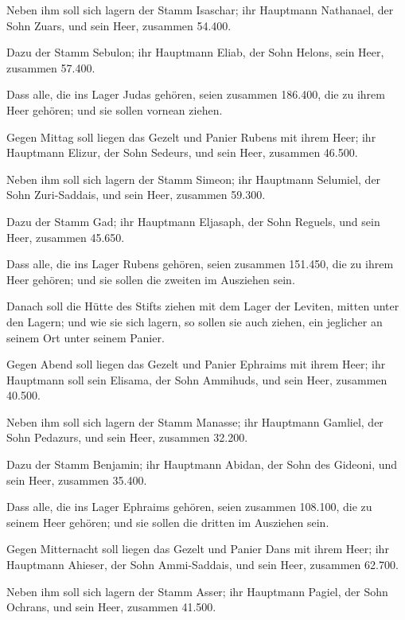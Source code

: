  Neben ihm soll sich lagern der Stamm Isaschar; ihr
Hauptmann Nathanael, der Sohn Zuars,  und sein Heer,
zusammen 54.400.

 Dazu der Stamm Sebulon; ihr Hauptmann Eliab, der Sohn
Helons,  sein Heer, zusammen 57.400.

 Dass alle, die ins Lager Judas gehören, seien zusammen
186.400, die zu ihrem Heer gehören; und sie sollen vornean ziehen.

 Gegen Mittag soll liegen das Gezelt und Panier Rubens
mit ihrem Heer; ihr Hauptmann Elizur, der Sohn Sedeurs, 
und sein Heer, zusammen 46.500.

 Neben ihm soll sich lagern der Stamm Simeon; ihr
Hauptmann Selumiel, der Sohn Zuri-Saddais,  und sein
Heer, zusammen 59.300.

 Dazu der Stamm Gad; ihr Hauptmann Eljasaph, der Sohn
Reguels,  und sein Heer, zusammen 45.650.

 Dass alle, die ins Lager Rubens gehören, seien zusammen
151.450, die zu ihrem Heer gehören; und sie sollen die zweiten im
Ausziehen sein.

 Danach soll die Hütte des Stifts ziehen mit dem Lager
der Leviten, mitten unter den Lagern; und wie sie sich lagern, so sollen
sie auch ziehen, ein jeglicher an seinem Ort unter seinem Panier.

 Gegen Abend soll liegen das Gezelt und Panier Ephraims
mit ihrem Heer; ihr Hauptmann soll sein Elisama, der Sohn Ammihuds,
 und sein Heer, zusammen 40.500.

 Neben ihm soll sich lagern der Stamm Manasse; ihr
Hauptmann Gamliel, der Sohn Pedazurs,  und sein Heer,
zusammen 32.200.

 Dazu der Stamm Benjamin; ihr Hauptmann Abidan, der Sohn
des Gideoni,  und sein Heer, zusammen 35.400.

 Dass alle, die ins Lager Ephraims gehören, seien
zusammen 108.100, die zu seinem Heer gehören; und sie sollen die dritten
im Ausziehen sein.

 Gegen Mitternacht soll liegen das Gezelt und Panier Dans
mit ihrem Heer; ihr Hauptmann Ahieser, der Sohn Ammi-Saddais,
 und sein Heer, zusammen 62.700.

 Neben ihm soll sich lagern der Stamm Asser; ihr
Hauptmann Pagiel, der Sohn Ochrans,  und sein Heer,
zusammen 41.500.

